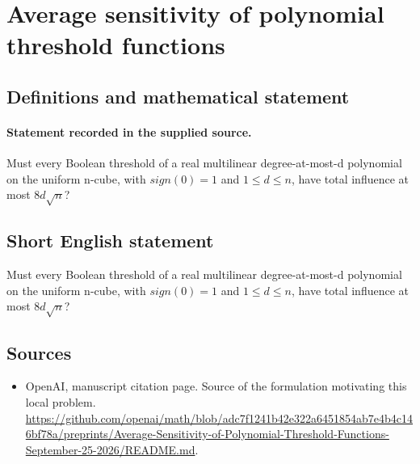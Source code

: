 \documentclass[11pt]{article}
\begin{document}
\section*{Average sensitivity of polynomial threshold functions}\label{statement}
\subsection{Definitions and mathematical statement}
\paragraph{Statement recorded in the supplied source.}
Must every Boolean threshold of a real multilinear degree-at-most-d polynomial on the uniform n-cube, with $sign(0)=1$ and $1\leq d\leq n$, have total influence at most $8d\surd n$?
\subsection{Short English statement}
Must every Boolean threshold of a real multilinear degree-at-most-d polynomial on the uniform n-cube, with $sign(0)=1$ and $1\leq d\leq n$, have total influence at most $8d\surd n$?
\subsection{Sources}
\begin{itemize}
\item[S1] OpenAI, manuscript citation page. Source of the formulation motivating this local problem.
\url{https://github.com/openai/math/blob/adc7f1241b42e322a6451854ab7e4b4c146bf78a/preprints/Average-Sensitivity-of-Polynomial-Threshold-Functions-September-25-2026/README.md}.
\end{itemize}
\end{document}
